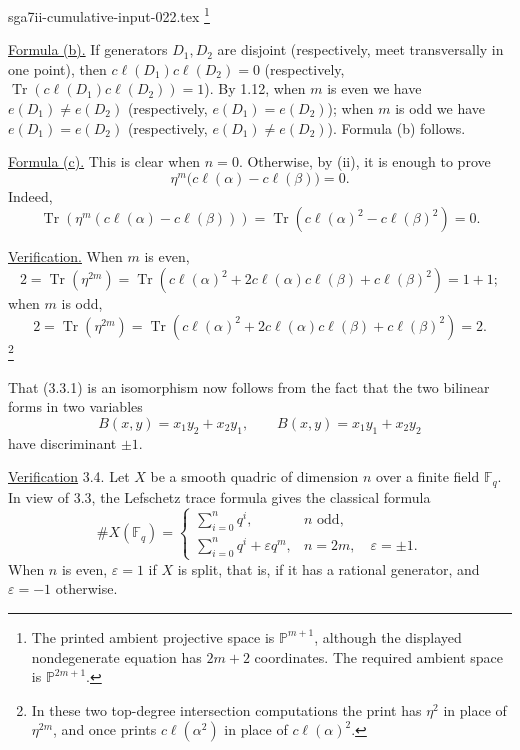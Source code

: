 \begin{filecontents*}{sga7ii-cumulative-input-022.tex}
\footnote{The printed ambient projective space is
$\mathbb P^{m+1}$, although the displayed nondegenerate equation has
$2m+2$ coordinates.  The required ambient space is
$\mathbb P^{2m+1}$.}

\underline{Formula (b).}  If generators $D_1,D_2$ are disjoint
(respectively, meet transversally in one point), then
$c\ell(D_1)c\ell(D_2)=0$ (respectively,
$\operatorname{Tr}(c\ell(D_1)c\ell(D_2))=1$).  By 1.12, when $m$ is
even we have $e(D_1)\neq e(D_2)$ (respectively,
$e(D_1)=e(D_2)$); when $m$ is odd we have $e(D_1)=e(D_2)$
(respectively, $e(D_1)\neq e(D_2)$).  Formula (b) follows.

\underline{Formula (c).}  This is clear when $n=0$.  Otherwise, by
(ii), it is enough to prove
\begin{equation*}
\eta^m\bigl(c\ell(\alpha)-c\ell(\beta)\bigr)=0.
\end{equation*}
Indeed,
\begin{equation*}
\operatorname{Tr}\!\left(
\eta^m(c\ell(\alpha)-c\ell(\beta))\right)
=\operatorname{Tr}\!\left(c\ell(\alpha)^2-c\ell(\beta)^2\right)=0.
\end{equation*}

\underline{Verification.}  When $m$ is even,
\begin{equation*}
2=\operatorname{Tr}(\eta^{2m})
=\operatorname{Tr}\!\left(c\ell(\alpha)^2
+2c\ell(\alpha)c\ell(\beta)+c\ell(\beta)^2\right)=1+1;
\end{equation*}
when $m$ is odd,
\begin{equation*}
2=\operatorname{Tr}(\eta^{2m})
=\operatorname{Tr}\!\left(c\ell(\alpha)^2
+2c\ell(\alpha)c\ell(\beta)+c\ell(\beta)^2\right)=2.
\end{equation*}
\footnote{In these two top-degree intersection computations the print
has $\eta^2$ in place of $\eta^{2m}$, and once prints
$c\ell(\alpha^2)$ in place of $c\ell(\alpha)^2$.}

That (3.3.1) is an isomorphism now follows from the fact that the two
bilinear forms in two variables
\begin{equation*}
B(x,y)=x_1y_2+x_2y_1,
\qquad
B(x,y)=x_1y_1+x_2y_2
\end{equation*}
have discriminant $\pm1$.


\underline{Verification} 3.4. Let $X$ be a smooth quadric of dimension
$n$ over a finite field $\mathbb F_q$.  In view of 3.3, the Lefschetz
trace formula gives the classical formula
\begin{equation*}
\#X(\mathbb F_q)=
\begin{cases}
\displaystyle\sum_{i=0}^{n}q^i,
  & n\text{ odd},\\[2ex]
\displaystyle\sum_{i=0}^{n}q^i+\varepsilon q^m,
  & n=2m,\quad \varepsilon=\pm1.
\end{cases}
\end{equation*}
When $n$ is even, $\varepsilon=1$ if $X$ is split, that is, if it has a
rational generator, and $\varepsilon=-1$ otherwise.


\end{filecontents*}
